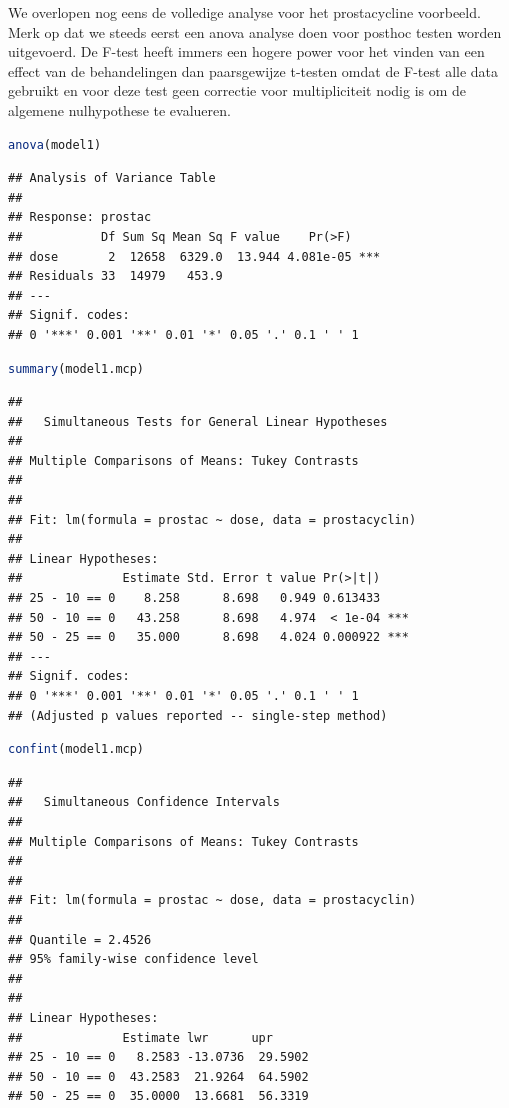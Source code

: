 \documentclass[
  12pt,dutch,coursenotes]{book}
\begin{document}
We overlopen nog eens de volledige analyse voor het prostacycline voorbeeld.
Merk op dat we steeds eerst een anova analyse doen voor posthoc testen worden uitgevoerd.
De F-test heeft immers een hogere power voor het vinden van een effect van de behandelingen dan paarsgewijze t-testen omdat de F-test alle data gebruikt en voor deze test geen correctie voor multipliciteit nodig is om de algemene nulhypothese te evalueren.

\begin{lstlisting}[language=R]
anova(model1)
\end{lstlisting}

\begin{lstlisting}
## Analysis of Variance Table
## 
## Response: prostac
##           Df Sum Sq Mean Sq F value    Pr(>F)    
## dose       2  12658  6329.0  13.944 4.081e-05 ***
## Residuals 33  14979   453.9                      
## ---
## Signif. codes:  
## 0 '***' 0.001 '**' 0.01 '*' 0.05 '.' 0.1 ' ' 1
\end{lstlisting}

\begin{lstlisting}[language=R]
summary(model1.mcp)
\end{lstlisting}

\begin{lstlisting}
## 
##   Simultaneous Tests for General Linear Hypotheses
## 
## Multiple Comparisons of Means: Tukey Contrasts
## 
## 
## Fit: lm(formula = prostac ~ dose, data = prostacyclin)
## 
## Linear Hypotheses:
##              Estimate Std. Error t value Pr(>|t|)    
## 25 - 10 == 0    8.258      8.698   0.949 0.613433    
## 50 - 10 == 0   43.258      8.698   4.974  < 1e-04 ***
## 50 - 25 == 0   35.000      8.698   4.024 0.000922 ***
## ---
## Signif. codes:  
## 0 '***' 0.001 '**' 0.01 '*' 0.05 '.' 0.1 ' ' 1
## (Adjusted p values reported -- single-step method)
\end{lstlisting}

\begin{lstlisting}[language=R]
confint(model1.mcp)
\end{lstlisting}

\begin{lstlisting}
## 
##   Simultaneous Confidence Intervals
## 
## Multiple Comparisons of Means: Tukey Contrasts
## 
## 
## Fit: lm(formula = prostac ~ dose, data = prostacyclin)
## 
## Quantile = 2.4526
## 95% family-wise confidence level
##  
## 
## Linear Hypotheses:
##              Estimate lwr      upr     
## 25 - 10 == 0   8.2583 -13.0736  29.5902
## 50 - 10 == 0  43.2583  21.9264  64.5902
## 50 - 25 == 0  35.0000  13.6681  56.3319
\end{lstlisting}
\end{document}

